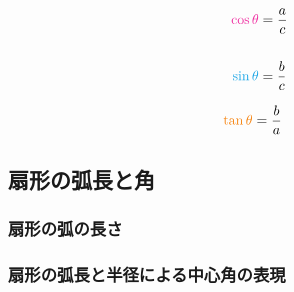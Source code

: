 \documentclass[../../math-imaging]{subfiles}
\begin{document}
\begin{figure}[h]
\begin{minipage}{0.49\columnwidth}
  \end{minipage}
  \begin{minipage}{0.22\columnwidth}
    \centering
    \Large
    \begin{align*}
      \color{Rhodamine}
      \cos \theta & = \dfrac{a}{c} \\\\
      \color{Cerulean}
      \sin \theta & = \dfrac{b}{c}
    \end{align*}
  \end{minipage}
  \begin{minipage}{0.22\columnwidth}
    \centering
    \Large
    \begin{align*}
      \color{BurntOrange}
      \tan \theta & = \dfrac{b}{a}
    \end{align*}
  \end{minipage}
\end{figure}

\subsection{扇形の弧長と角}

\subsubsection{扇形の弧の長さ}

\subsubsection{扇形の弧長と半径による中心角の表現}
\end{document}
